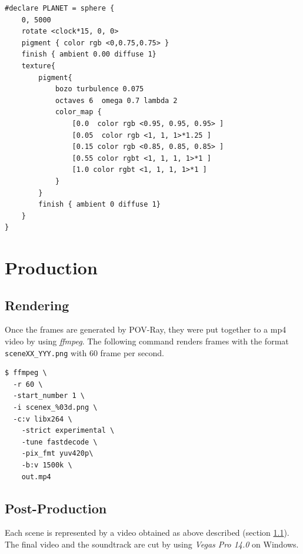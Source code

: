 \begin{lstlisting}
#declare PLANET = sphere {
	0, 5000
	rotate <clock*15, 0, 0>
	pigment { color rgb <0,0.75,0.75> }
	finish { ambient 0.00 diffuse 1}
	texture{
		pigment{
			bozo turbulence 0.075
			octaves 6  omega 0.7 lambda 2
			color_map {
				[0.0  color rgb <0.95, 0.95, 0.95> ]
				[0.05  color rgb <1, 1, 1>*1.25 ]
				[0.15 color rgb <0.85, 0.85, 0.85> ]
				[0.55 color rgbt <1, 1, 1, 1>*1 ]
				[1.0 color rgbt <1, 1, 1, 1>*1 ]
			}
		}
		finish { ambient 0 diffuse 1}
	}
}
\end{lstlisting}

\chapter{Production}

\section{Rendering} \label{rendering}
Once the frames are generated by POV-Ray, they were put together to a mp4 video by using \textit{ffmpeg}.
The following command renders frames with the format \texttt{sceneXX\_YYY.png} with 60 frame per second.

\begin{lstlisting}
$ ffmpeg \
  -r 60 \
  -start_number 1 \
  -i scenex_%03d.png \
  -c:v libx264 \
	-strict experimental \
	-tune fastdecode \
	-pix_fmt yuv420p\
	-b:v 1500k \
	out.mp4

\end{lstlisting}

\section{Post-Production}

Each scene is represented by a video obtained as above described (section \ref{rendering}). The final video and the soundtrack are cut by using \textit{Vegas Pro 14.0} \cite{VegasPro} on Windows.
